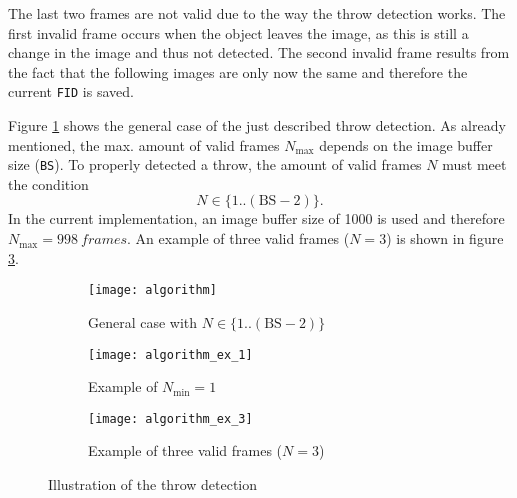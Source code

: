 The last two frames are not valid due to the way the throw detection works.
The first invalid frame occurs when the object leaves the image, as this is still a change in the image and thus not detected.
The second invalid frame results from the fact that the following images are only now the same and therefore the current \texttt{FID} is saved.

Figure \ref{subfig:algorithm_general_case} shows the general case of the just described throw detection.
As already mentioned, the max. amount of valid frames $N_\text{max}$ depends on the image buffer size (\texttt{BS}).
To properly detected a throw, the amount of valid frames $N$ must meet the condition
\[
  N \in \{1..(\text{BS}-2)\}.
\]
In the current implementation, an image buffer size of \SI{1000}{} is used and therefore $N_\text{max} = \SI{998}{frames}$.
An example of three valid frames ($N = 3$) is shown in figure \ref{subfig:algorithm_example_3}.

\begin{figure}[h]
  \centering
  \begin{subfigure}[b]{\textwidth}
    \texttt{[image: algorithm]}
    \caption{General case with $N \in \{1..(\text{BS}-2)\}$}
    \label{subfig:algorithm_general_case}
  \end{subfigure}
  \begin{subfigure}[b]{\textwidth}
    \texttt{[image: algorithm\_ex\_1]}
    \caption{Example of $N_\text{min} = 1$}
    \label{subfig:algorithm_example_1}
  \end{subfigure}
  \begin{subfigure}[b]{\textwidth}
    \texttt{[image: algorithm\_ex\_3]}
    \caption{Example of three valid frames ($N = 3$)}
    \label{subfig:algorithm_example_3}
  \end{subfigure}
  \caption{Illustration of the throw detection}
  \label{fig:throw_detection}
\end{figure}
